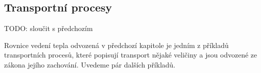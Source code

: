 % 
% 
% 
% 
% 
% 
% 
% 
% 
% 
% 






\subsection{Transportní procesy}
TODO: sloučit s předchozím

Rovnice vedení tepla odvozená v předchozí kapitole je jedním z příkladů transportních procesů, které popisují transport nějaké veličiny a
jsou odvozené ze zákona jejího zachování. Uvedeme pár dalších příkladů.

